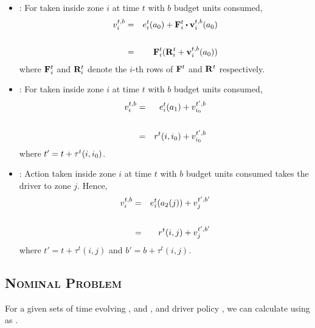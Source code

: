 \begin{itemize}
	\item {\getpassenger} : For {\getpassengeraction} taken inside zone $i$ at time $t$ with $b$ budget units consumed,
	\begin{eqnarray}
	\cumulativeearning{i}{t,b} &=& \actionearning{i}{t}{\getpassengeraction} + \empiricaltransitionmatrix_{i}^{t} \bigcdot \inducedearningvector{i}{t,b}{\getpassengeraction} \\
	\nonumber\\
	&=& \empiricaltransitionmatrix_{i}^{t} (\rewardsmatrix_{i}^{t} + \inducedearningvector{i}{t,b}{\getpassengeraction}) \label{eq:cumulative_earning_get_passenger}
	\end{eqnarray}
	where ${\mathbf{F}}_{i}^{t}$ and ${\mathbf{R}}_{i}^{t}$ denote the $i$-th rows of ${\mathbf{F}}^{t}$ and ${\mathbf{R}}^{t}$ respectively. \\

	\item {\gohome} : For {\gohomeaction} taken inside zone $i$ at time $t$ with $b$ budget units consumed,
	\begin{eqnarray}
	v_{i}^{t,b} &=& e_{i}^{t}({a_1}) + v_{{i_0}}^{t',b} \\
	\nonumber\\
	&=& r^t(i,{i_0}) + v_{{i_0}}^{t',b} 
	\end{eqnarray}
	where $t' = t + \tau^t(i,{i_0})$. \\

	\item {\relocate} : Action {\relocateaction} taken inside zone $i$ at time $t$ with $b$ budget units consumed takes the driver to zone $j$.
	Hence,
	\begin{eqnarray}
	v_{i}^{t,b} &=& e_{i}^{t}({a_2(j)}) + v_{j}^{t',b'} \\
	\nonumber \\
	&=& r^t(i,j) + v_{j}^{t',b'}
	\end{eqnarray}
	where $t' = t + \tau^t(i,j)$ and $b' = b + \tau^t(i,j)$. 
\end{itemize}

\subsection{\textsc{Nominal Problem}}
For a given sets of time evolving {\empiricaltransitionmatrix}, {\traveltimematrix} and {\rewardsmatrix}, and driver policy \policy, we can calculate {\totalexpectedearnings} using as {}.

